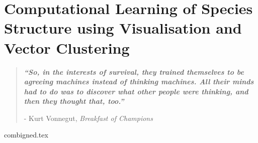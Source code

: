 

\chapter{ Computational Learning of Species Structure using Visualisation and Vector Clustering}


\blankpage
\restoregeometry
\vspace*{0.15\paperheight}


\begin{center}
\begin{quotation}
  \large{\emph{\textbf{``So, in the interests of survival, they trained themselves to be agreeing machines instead of thinking machines. All their minds had to do was to discover what other people were thinking, and then they thought that, too.''} }  }  \\
  \begin{flushright}
  - Kurt Vonnegut, \textit{Breakfast of Champions}
  \end{flushright}
 \end{quotation}
\end{center}
\doublespacing
\newpage

%





{combigned.tex}

\chapterbib
